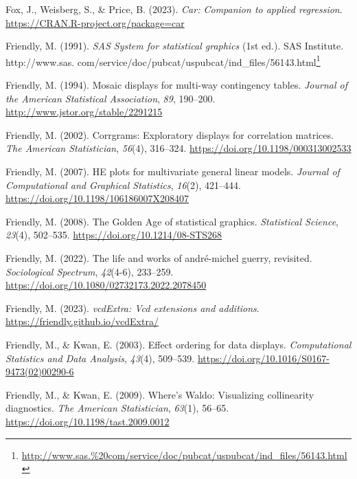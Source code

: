 \documentclass[
  letterpaper,
  10pt,
  krantz2]{krantz}
\newlength{\cslhangindent}
\newlength{\cslentryspacingunit} %
\newenvironment{CSLReferences}[2] %
 {%
  \setlength{\parindent}{0pt}
  \ifodd #1
  \let\oldpar\par
  \def\par{\hangindent=\cslhangindent\oldpar}
  \fi
  \setlength{\parskip}{#2\cslentryspacingunit}
 }%
 {}
\providecommand{\href}[2]{#2\footnote{\url{#1}}}
\begin{document}
\begin{CSLReferences}{1}{0}
\leavevmode{}%
Fox, J., Weisberg, S., \& Price, B. (2023). \emph{Car: Companion to
applied regression}. \url{https://CRAN.R-project.org/package=car}

\leavevmode{}%
Friendly, M. (1991). \emph{{SAS System} for statistical graphics} (1st
ed.). SAS Institute.
\href{http://www.sas.\%20com/service/doc/pubcat/uspubcat/ind_files/56143.html}{http://www.sas.
com/service/doc/pubcat/uspubcat/ind\_files/56143.html}

\leavevmode{}%
Friendly, M. (1994). Mosaic displays for multi-way contingency tables.
\emph{Journal of the American Statistical Association}, \emph{89},
190--200. \url{http://www.jstor.org/stable/2291215}

\leavevmode{}%
Friendly, M. (2002). Corrgrams: Exploratory displays for correlation
matrices. \emph{The American Statistician}, \emph{56}(4), 316--324.
\url{https://doi.org/10.1198/000313002533}

\leavevmode{}%
Friendly, M. (2007). {HE} plots for multivariate general linear models.
\emph{Journal of Computational and Graphical Statistics}, \emph{16}(2),
421--444. \url{https://doi.org/10.1198/106186007X208407}

\leavevmode{}%
Friendly, M. (2008). The {Golden Age} of statistical graphics.
\emph{Statistical Science}, \emph{23}(4), 502--535.
\url{https://doi.org/10.1214/08-STS268}

\leavevmode{}%
Friendly, M. (2022). The life and works of andr{é}-michel guerry,
revisited. \emph{Sociological Spectrum}, \emph{42}(4-6), 233--259.
\url{https://doi.org/10.1080/02732173.2022.2078450}

\leavevmode{}%
Friendly, M. (2023). \emph{vcdExtra: Vcd extensions and additions}.
\url{https://friendly.github.io/vcdExtra/}

\leavevmode{}%
Friendly, M., \& Kwan, E. (2003). Effect ordering for data displays.
\emph{Computational Statistics and Data Analysis}, \emph{43}(4),
509--539. \url{https://doi.org/10.1016/S0167-9473(02)00290-6}

\leavevmode{}%
Friendly, M., \& Kwan, E. (2009). Where's {Waldo}: Visualizing
collinearity diagnostics. \emph{The American Statistician},
\emph{63}(1), 56--65. \url{https://doi.org/10.1198/tast.2009.0012}


\end{CSLReferences}
\end{document}
